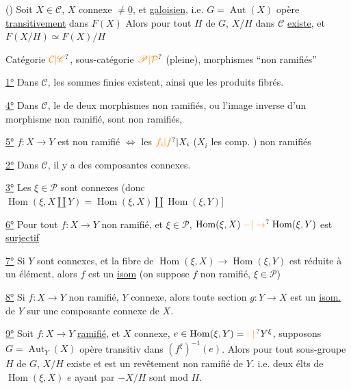 () Soit $X\in\mathcal C$, $X$ connexe $\ne\underline{0}$, et \uline{galoisien},  i.e.
 $G=\operatorname{Aut}(X)$ opère \uline{transitivement} dans $F(X)$
Alors pour tout  $H$ de $G$, $X/H$ dans $\mathcal C$ \uline{existe},
et $F(X/H)\simeq F(X)/H$

Catégorie $\unsure{\mathcal C|\mathscr C}$, sous-catégorie $\unsure{\mathscr P|\mathcal P}$\deleted{\unsure{,}} (pleine), morphismes ``non ramifiés''

\uline{1°} Dans $\mathcal C$, les sommes finies existent, ainsi que les produits fibrés.

\uline{4°} Dans $\mathcal C$, le   de deux morphismes non ramifiés,  ou l'image
inverse d'un morphisme non ramifié, sont non ramifiés, 

\uline{5°}  $f:X\to Y$ est non ramifié $\Longleftrightarrow$ les $\unsure{f_i|f}\vert X_i$ ($X_i$ les comp. )  non ramifiés

\uline{2°} Dans $\mathcal C$, il y a des composantes connexes.

\uline{3°} Les  $\xi\in\mathscr P$ sont connexes (donc $\operatorname{Hom}(\xi,X\amalg Y)=\operatorname{Hom}(\xi,X)\amalg\operatorname{Hom}(\xi,Y)$]

\uline{6°} Pour tout $f:X\to Y$ non ramifié,  et $\xi\in\mathscr P$, $\operatorname{Hom}(\xi,X)\mathrel{\unsure{-|\to}}\operatorname{Hom}(\xi,Y)$ est
\uline{surjectif}

\uline{7°} Si  $Y$ sont connexes, et la fibre de $\operatorname{Hom}(\xi,X)\to\operatorname{Hom}(\xi,Y)$ est
réduite à un élément, alors  $f$ est un \uline{isom}
(on suppose $f$ non ramifié, $\xi\in\mathscr P$)

\uline{8°} Si $f:X\to Y$ non ramifié, $Y$ connexe, alors  toute
 section $g:Y\to X$ est un \uline{isom.} de $Y$ sur une
composante connexe de $X$.

\uline{9°} Soit  $f:X\to Y$ \uline{ramifié}, et
$X$ connexe, \deleted{\unsure{$\xi\in$}} $e\in\operatorname{Hom}(\xi,Y)=\unsure{:|\,}Y^\xi$, supposons $G=\operatorname{Aut}_Y(X)$
opère transitiv dans $(f^\xi)^{-1}(e)$. Alors pour tout
sous-groupe $H$ de $G$, $X/H$ existe  et est un
revêtement non ramifié de $Y$. 
i.e. deux élts de $\operatorname{Hom}(\xi,X)$  $e$
ayant  par  $\mathrel{-} X/H$ sont  mod $H$.

